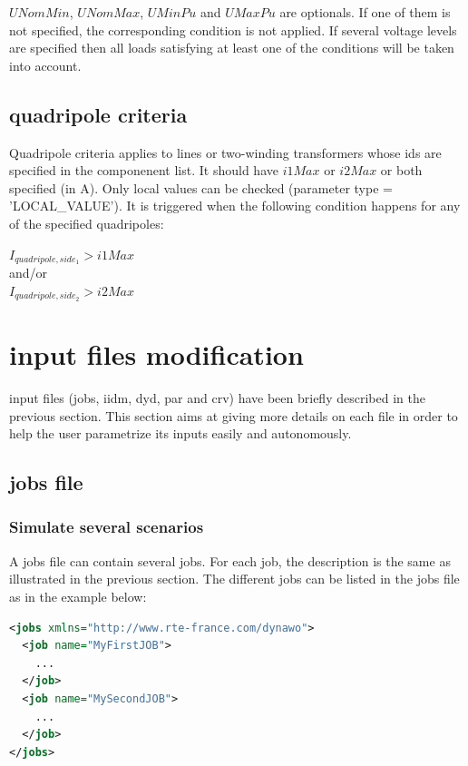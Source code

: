 \documentclass[a4paper, 12pt]{report}
\begin{document}
$UNomMin$, $UNomMax$, $UMinPu$ and $UMaxPu$ are optionals. If one of them is not
specified, the corresponding condition is not applied.
If several voltage levels are specified then all loads satisfying at least one of the conditions will be taken into account.

\subsection{quadripole criteria}

Quadripole criteria applies to lines or two-winding transformers whose
ids are specified in the componenent list. It
should have $i1Max$ or $i2Max$ or both specified (in A). Only
local values can be checked (parameter type = 'LOCAL\_VALUE').
It is triggered when the following condition happens for any of the specified
quadripoles: \\
\begin{center}
$I_{quadripole,side_1} > i1Max$\\
and/or\\
$I_{quadripole,side_2} > i2Max$\\
\end{center}

\section[Dynawo input files modification]{\Dynawo input files modification}

\Dynawo input files (jobs, iidm, dyd, par and crv) have been briefly described in the previous section. This section aims at giving more details on each file in order to help the user parametrize its inputs easily and autonomously.

\subsection{jobs file}

\subsubsection{Simulate several scenarios}

A jobs file can contain several jobs. For each job, the description is the same as illustrated in the previous section. The different jobs can be listed in the jobs file as in the example below:

\begin{lstlisting}[language=XML, morekeywords={name}]
<jobs xmlns="http://www.rte-france.com/dynawo">
  <job name="MyFirstJOB">
    ...
  </job>
  <job name="MySecondJOB">
    ...
  </job>
</jobs>
\end{lstlisting}
\end{document}
